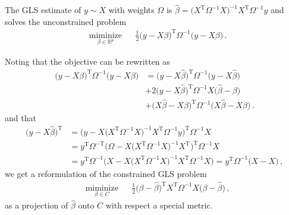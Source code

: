 \documentclass[a4paper]{article}
\newcommand{\real}{\mathbb{R}}
\newcommand{\T}{\mathrm{T}}
\begin{document}
The GLS estimate of $y\sim X$ with weights $\Omega$ is $\hat{\beta} = \bigl(X^\T \Omega^{-1} X
\bigr)^{-1} X^\T \Omega^{-1} y$ and solves the unconstrained problem
\begin{equation} \label{eq:gls_unc}
  \begin{aligned}
    & \underset{\beta\in \real^p}{\text{miminize}}
      & & \tfrac12 \bigl(y - X \beta\bigr)^\T \Omega^{-1} \bigl(y - X \beta\bigr)
          \,.
  \end{aligned}
\end{equation}

Noting that the objective can be rewritten as
\begin{align*}
  \bigl(y - X \beta\bigr)^\T \Omega^{-1} \bigl(y - X \beta\bigr)
    &= \bigl(y - X \hat{\beta}\bigr)^\T \Omega^{-1} \bigl(y - X \hat{\beta}\bigr)
    \\
    &+ 2 \bigl(y - X \hat{\beta}\bigr)^\T \Omega^{-1} X \bigl(\hat{\beta} - \beta\bigr)
    \\
    &+ \bigl(X \hat{\beta} - X \beta\bigr)^\T \Omega^{-1} \bigl(X \hat{\beta} - X \beta\bigr)
    \,.
\end{align*}
and that
\begin{align*}
  \bigl(y - X \hat{\beta}\bigr)^\T
    &= \bigl(y - X \bigl(X^\T \Omega^{-1} X \bigr)^{-1} X^\T \Omega^{-1} y\bigr)^\T \Omega^{-1} X
    \\
    &= y^\T \Omega^{-\T} \bigl(\Omega - X \bigl(X^\T \Omega^{-1} X \bigr)^{-1} X^\T \bigr)^\T \Omega^{-1} X
    \\
    &= y^\T \Omega^{-1} \bigl(X - X \bigl(X^\T \Omega^{-1} X \bigr)^{-1} X^\T \Omega^{-1} X \bigr)
    = y^\T \Omega^{-1} \bigl(X - X\bigr)
    \,,
\end{align*}
we get a reformulation of the constrained GLS problem
\begin{equation} \label{eq:gls_proj}
  \begin{aligned}
    & \underset{\beta\in C}{\text{miminize}}
      & & \tfrac12 \bigl(\beta - \hat{\beta} \bigr)^\T X^\T \Omega^{-1} X \bigl(\beta - \hat{\beta}\bigr)
          \,,
  \end{aligned}
\end{equation}
as a projection of $\hat{\beta}$ onto $C$ with respect a special metric.

\end{document}
